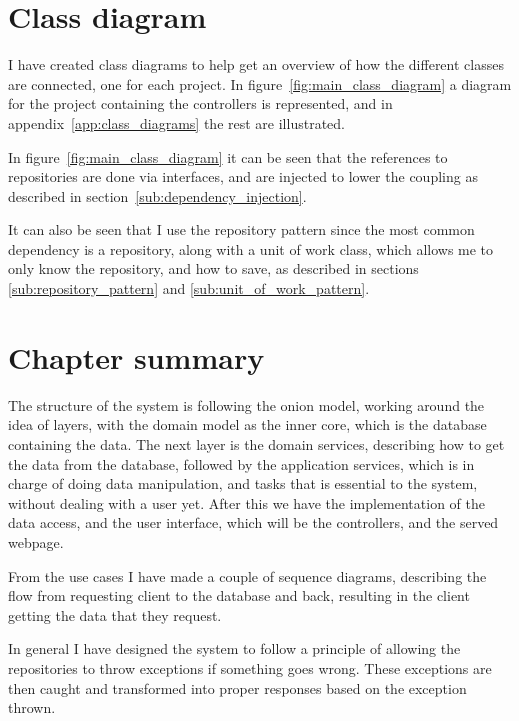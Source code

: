 \section{Class diagram}
\label{sec:class_diagram}

I have created class diagrams to help get an overview of how the different
classes are connected, one for each project. In
figure~\ref{fig:main_class_diagram} a diagram for the project containing the
controllers is represented, and in appendix~\ref{app:class_diagrams} the rest
are illustrated.

In figure~\ref{fig:main_class_diagram} it can be seen that the references to
repositories are done via interfaces, and are injected to lower the coupling
as described in section~\ref{sub:dependency_injection}.

It can also be seen that I use the repository pattern since the most common
dependency is a repository, along with a unit of work class, which allows me to
only know the repository, and how to save, as described in sections
\ref{sub:repository_pattern} and \ref{sub:unit_of_work_pattern}.


\section{Chapter summary}
The structure of the system is following the onion model, working around the
idea of layers, with the domain model as the inner core, which is the database
containing the data. The next layer is the domain services, describing how to
get the data from the database, followed by the application services, which is
in charge of doing data manipulation, and tasks that is essential to the system,
without dealing with a user yet. After this we have the implementation of the
data access, and the user interface, which will be the controllers, and the
served webpage.

From the use cases I have made a couple of sequence diagrams, describing the flow
from requesting client to the database and back, resulting in the client
getting the data that they request. 

In general I have designed the system to follow a principle of allowing the
repositories to throw exceptions if something goes wrong. These exceptions are
then caught and transformed into proper responses based on the exception thrown.


